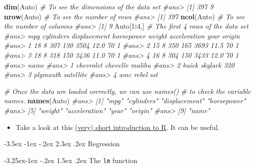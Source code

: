 \documentclass[]{book}
\makeatletter
\newenvironment{Shaded}{\begin{snugshade}}{\end{snugshade}}
\newcommand{\KeywordTok}[1]{\textcolor[rgb]{0.13,0.29,0.53}{\textbf{#1}}}
\newcommand{\DecValTok}[1]{\textcolor[rgb]{0.00,0.00,0.81}{#1}}
\newcommand{\CommentTok}[1]{\textcolor[rgb]{0.56,0.35,0.01}{\textit{#1}}}
\newcommand{\OperatorTok}[1]{\textcolor[rgb]{0.81,0.36,0.00}{\textbf{#1}}}
\newcommand{\NormalTok}[1]{#1}
\newenvironment{rmdblock}[1]
  {\begin{shaded*}
  \begin{itemize}
  \renewcommand{\labelitemi}{
    \raisebox{-.7\height}[0pt][0pt]{
      {\setkeys{Gin}{width=2em,keepaspectratio}\texttt{[image: img/icons/\#1]}}
    }
  }
  \item
  }
  {
  \end{itemize}
  \end{shaded*}
  }
\newenvironment{rmdinsight}
  {\begin{rmdblock}{insight}}
  {\end{rmdblock}}
\renewcommand\section{\@startsection {section}{1}{\z@}%
                                   {-3.5ex \@plus -1ex \@minus -.2ex}%
                                   {2.3ex \@plus.2ex}%
                                   {\normalfont\Large\bfseries\color{ForestGreen}}}
\renewcommand\subsection{\@startsection{subsection}{2}{\z@}%
                                     {-3.25ex\@plus -1ex \@minus -.2ex}%
                                     {1.5ex \@plus .2ex}%
                                     {\normalfont\large\bfseries\color{Violet}}}
\theoremstyle{definition}
\theoremstyle{definition}
\theoremstyle{definition}
\theoremstyle{remark}
\makeatother
\begin{document}
\begin{Shaded}
\begin{Highlighting}[]
\KeywordTok{dim}\NormalTok{(Auto) }\CommentTok{# To see the dimensions of the data set}
\CommentTok{#ans> [1] 397   9}
\KeywordTok{nrow}\NormalTok{(Auto) }\CommentTok{# To see the number of rows}
\CommentTok{#ans> [1] 397}
\KeywordTok{ncol}\NormalTok{(Auto) }\CommentTok{# To see the number of columns}
\CommentTok{#ans> [1] 9}
\NormalTok{Auto[}\DecValTok{1}\OperatorTok{:}\DecValTok{4}\NormalTok{,] }\CommentTok{# The first 4 rows of the data set}
\CommentTok{#ans>   mpg cylinders displacement horsepower weight acceleration year origin}
\CommentTok{#ans> 1  18         8          307        130   3504         12.0   70      1}
\CommentTok{#ans> 2  15         8          350        165   3693         11.5   70      1}
\CommentTok{#ans> 3  18         8          318        150   3436         11.0   70      1}
\CommentTok{#ans> 4  16         8          304        150   3433         12.0   70      1}
\CommentTok{#ans>                        name}
\CommentTok{#ans> 1 chevrolet chevelle malibu}
\CommentTok{#ans> 2         buick skylark 320}
\CommentTok{#ans> 3        plymouth satellite}
\CommentTok{#ans> 4             amc rebel sst}
\end{Highlighting}
\end{Shaded}

\begin{Shaded}
\begin{Highlighting}[]
\CommentTok{# Once the data are loaded correctly, we can use names()}
\CommentTok{# to check the variable names.}
\KeywordTok{names}\NormalTok{(Auto)}
\CommentTok{#ans> [1] "mpg"          "cylinders"    "displacement" "horsepower"  }
\CommentTok{#ans> [5] "weight"       "acceleration" "year"         "origin"      }
\CommentTok{#ans> [9] "name"}
\end{Highlighting}
\end{Shaded}

\begin{rmdinsight}
Take a look at this
\href{https://cran.r-project.org/doc/contrib/Torfs+Brauer-Short-R-Intro.pdf}{(very)
short introduction to R}. It can be useful.
\end{rmdinsight}

\section{Regression}\label{regression}

\subsection{\texorpdfstring{The \texttt{lm}
function}{The lm function}}\label{the-lm-function}
\end{document}
